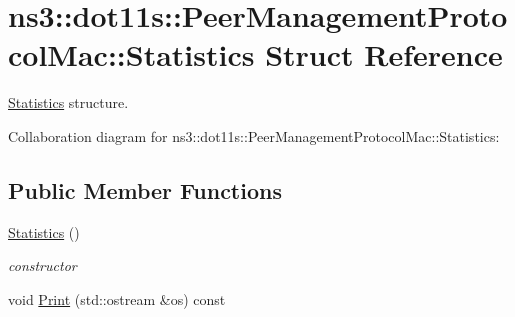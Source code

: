 \hypertarget{structns3_1_1dot11s_1_1PeerManagementProtocolMac_1_1Statistics}{}\section{ns3\+:\+:dot11s\+:\+:Peer\+Management\+Protocol\+Mac\+:\+:Statistics Struct Reference}
\label{structns3_1_1dot11s_1_1PeerManagementProtocolMac_1_1Statistics}


\hyperlink{structns3_1_1dot11s_1_1PeerManagementProtocolMac_1_1Statistics}{Statistics} structure.  




Collaboration diagram for ns3\+:\+:dot11s\+:\+:Peer\+Management\+Protocol\+Mac\+:\+:Statistics\+:
\subsection*{Public Member Functions}
\begin{DoxyCompactItemize}
\item 
\hyperlink{structns3_1_1dot11s_1_1PeerManagementProtocolMac_1_1Statistics_a1d67da4cf8375e2f36ca114856518eec}{Statistics} ()
\begin{DoxyCompactList}\small\item\em constructor \end{DoxyCompactList}\item 
void \hyperlink{structns3_1_1dot11s_1_1PeerManagementProtocolMac_1_1Statistics_a87ebe882e5a23a5d1c287ff554c07a76}{Print} (std\+::ostream \&os) const 
\end{DoxyCompactItemize}
